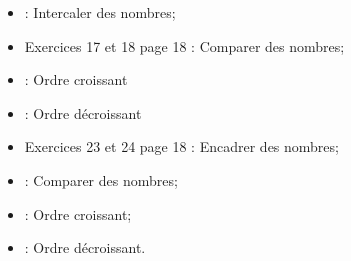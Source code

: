 \begin{myexos}
	\begin{itemize}
		\item {} : Intercaler des nombres;
		\item Exercices 17 et 18 page 18 : Comparer des nombres;
		\item {} : Ordre croissant
		\item {} : Ordre décroissant
		\item Exercices 23 et 24 page 18 : Encadrer des nombres;
		\item {} : Comparer des nombres;
		\item {} : Ordre croissant;
		\item {} : Ordre décroissant.
	\end{itemize}
\end{myexos}